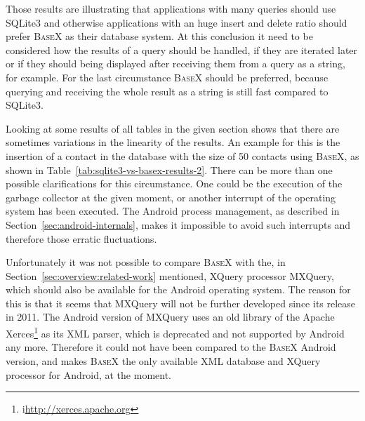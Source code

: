 Those results are illustrating that applications with many queries should use SQLite3 and otherwise applications with an huge insert and delete ratio should prefer \textsc{BaseX} as their database system.
At this conclusion it need to be considered how the results of a query should be handled, if they are iterated later or if they should being displayed after receiving them from a query as a string, for example.
For the last circumstance \textsc{BaseX} should be preferred, because querying and receiving the whole result as a string is still fast compared to SQLite3.

Looking at some results of all tables in the given section shows that there are sometimes variations in the linearity of the results.
An example for this is the insertion of a contact in the database with the size of 50 contacts using \textsc{BaseX}, as shown in Table~\ref{tab:sqlite3-vs-basex-results-2}.
There can be more than one possible clarifications for this circumstance.
One could be the execution of the garbage collector at the given moment, or another interrupt of the operating system has been executed.
The Android process management, as described in Section~\ref{sec:android-internals}, makes it impossible to avoid such interrupts and therefore those erratic fluctuations. 


Unfortunately it was not possible to compare \textsc{BaseX} with the, in Section~\ref{sec:overview:related-work} mentioned, XQuery processor MXQuery, which should also be available for the Android operating system.
The reason for this is that it seems that MXQuery will not be further developed since its release in 2011.
The Android version of MXQuery uses an old library of the Apache Xerces\footnote{i\url{http://xerces.apache.org}} as its XML parser, which is deprecated and not supported by Android any more.
Therefore it could not have been compared to the \textsc{BaseX} Android version, and makes \textsc{BaseX} the only available XML database and XQuery processor for Android, at the moment.

%

